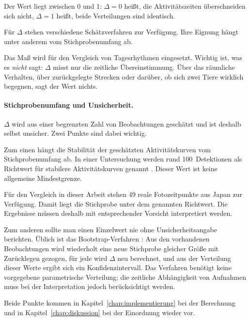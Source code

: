 \documentclass[12pt,a4paper]{report}
\begin{document}
Der Wert liegt zwischen 0 und 1: $\Delta = 0$ heißt, die Aktivitätszeiten
überschneiden sich nicht, $\Delta = 1$ heißt, beide Verteilungen sind identisch.


Für $\Delta$ stehen verschiedene Schätzverfahren zur Verfügung.
Ihre Eignung hängt unter anderem vom Stichprobenumfang ab.


Das Maß wird für den Vergleich von Tagesrhythmen eingesetzt. Wichtig ist, was es
\emph{nicht} sagt: $\Delta$ misst nur die zeitliche Übereinstimmung. Über das
räumliche Verhalten, über zurückgelegte Strecken oder darüber, ob sich zwei Tiere
wirklich begegnen, sagt der Wert nichts.


\paragraph{Stichprobenumfang und Unsicherheit.}

$\Delta$ wird aus einer begrenzten Zahl von Beobachtungen geschätzt und ist deshalb selbst
unsicher. Zwei Punkte sind dabei wichtig.


Zum einen hängt die Stabilität der geschätzten
Aktivitätskurven vom Stichprobenumfang ab.
In einer Untersuchung werden rund 100~Detektionen
als Richtwert für stabilere Aktivitätskurven genannt
\cite{Cove2018}. Dieser Wert ist keine allgemeine
Mindestgrenze.

Für den Vergleich in dieser Arbeit stehen
49 reale Fotozeitpunkte aus Japan zur Verfügung.
Damit liegt die Stichprobe unter dem genannten
Richtwert. Die Ergebnisse müssen deshalb
mit entsprechender Vorsicht interpretiert werden.


Zum anderen sollte man einen Einzelwert nie ohne Unsicherheitsangabe berichten. Üblich ist das Bootstrap-Verfahren \cite{Efron1979}: Aus den vorhandenen Beobachtungen wird wiederholt eine neue
Stichprobe gleicher Größe mit Zurücklegen gezogen, für jede wird $\Delta$ neu berechnet, und
aus der Verteilung dieser Werte ergibt sich ein Konfidenzintervall. Das Verfahren benötigt keine vorgegebene parametrische Verteilung; die
zeitliche Abhängigkeit von Aufnahmen muss bei der Interpretation jedoch
berücksichtigt werden.

Beide Punkte kommen in Kapitel~\ref{chap:implementierung} bei der Berechnung und in
Kapitel~\ref{chap:diskussion} bei der Einordnung wieder vor.


\end{document}
